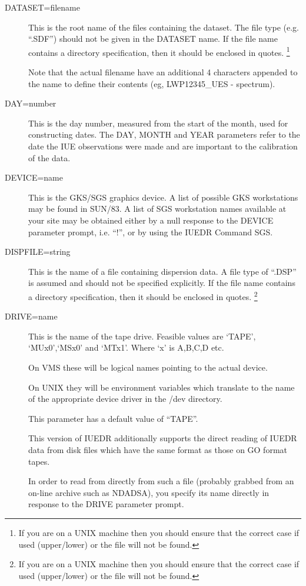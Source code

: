 \begin {description}
\item [DATASET=filename]
This is the root name of the files containing the dataset.
The file type (e.g. ``.SDF'') should not be given in the DATASET
name.
If the file name contains a directory specification, then it
should be enclosed in quotes.
\footnote{If you are on a UNIX machine then you should ensure that the
correct case if used (upper/lower) or the file will not be found.}

Note that the actual filename have an additional 4 characters appended
to the name to define their contents (eg, LWP12345\_UES - spectrum).

\item [DAY=number]
This is the day number, measured from the start of the month, used
for constructing dates. 
The DAY, MONTH and YEAR parameters refer to the date the IUE
observations were made and are important to the calibration of the
data.

\item [DEVICE=name]
This is the GKS/SGS graphics device.
A list of possible GKS workstations may be found in SUN/83.
A list of SGS workstation names available at your 
site may be obtained either by a null response to the DEVICE parameter 
prompt, i.e. ``!'', or by using the IUEDR Command SGS.

\item [DISPFILE=string]
This is the name of a file containing dispersion data.
A file type of ``.DSP'' is assumed and should not be specified
explicitly.
If the file name contains a directory specification, then it should be
enclosed in quotes.
\footnote{If you are on a UNIX machine then you should ensure that the
correct case if used (upper/lower) or the file will not be found.}

\item [DRIVE=name] This is the name of the tape drive. Feasible values
are `TAPE', `MUx0',`MSx0' and `MTx1'. Where `x' is A,B,C,D
etc.

On VMS these will be logical names pointing to the actual device.

On UNIX they will be environment variables which translate to the
name of the appropriate device driver in the /dev directory.

This parameter has a default value of ``TAPE''.

This version of IUEDR additionally supports the direct reading of 
IUEDR data from disk files which have the same format as those on
GO format tapes. 

In order to read from directly from such a file (probably grabbed from
an on-line archive such as NDADSA), you specify its name directly in
response to the DRIVE parameter prompt.


\end{description}
